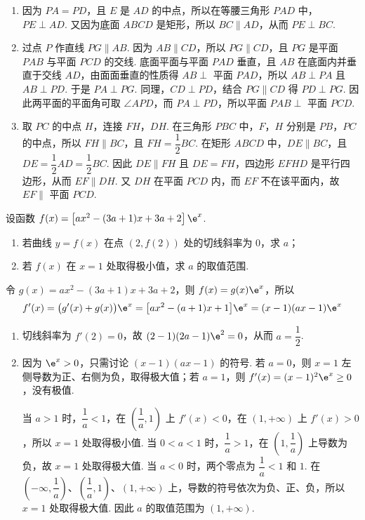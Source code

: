 \begin{solution}
\begin{enumerate}
\item 因为 \(PA=PD\)，且 \(E\) 是 \(AD\) 的中点，所以在等腰三角形 \(PAD\) 中，\(PE\perp AD\). 又因为底面 \(ABCD\) 是矩形，所以 \(BC\parallel AD\)，从而 \(PE\perp BC\).
\item 过点 \(P\) 作直线 \(PG\parallel AB\). 因为 \(AB\parallel CD\)，所以 \(PG\parallel CD\)，且 \(PG\) 是平面 \(PAB\) 与平面 \(PCD\) 的交线. 底面平面与平面 \(PAD\) 垂直，且 \(AB\) 在底面内并垂直于交线 \(AD\)，由面面垂直的性质得 \(AB\perp\) 平面 \(PAD\)，所以 \(AB\perp PA\) 且 \(AB\perp PD\). 于是 \(PA\perp PG\). 同理，\(CD\perp PD\)，结合 \(PG\parallel CD\) 得 \(PD\perp PG\). 因此两平面的平面角可取 \(\angle APD\)，而 \(PA\perp PD\)，所以平面 \(PAB\perp\) 平面 \(PCD\).
\item 取 \(PC\) 的中点 \(H\)，连接 \(FH\)，\(DH\). 在三角形 \(PBC\) 中，\(F\)，\(H\) 分别是 \(PB\)，\(PC\) 的中点，所以 \(FH\parallel BC\)，且 \(FH=\dfrac12BC\). 在矩形 \(ABCD\) 中，\(DE\parallel BC\)，且 \(DE=\dfrac12AD=\dfrac12BC\). 因此 \(DE\parallel FH\) 且 \(DE=FH\)，四边形 \(EFHD\) 是平行四边形，从而 \(EF\parallel DH\). 又 \(DH\) 在平面 \(PCD\) 内，而 \(EF\) 不在该平面内，故 \(EF\parallel\) 平面 \(PCD\).
\end{enumerate}
\end{solution}


\begin{problem}

设函数 \(f(x)=\left[ax^2-(3a+1)x+3a+2\right]\e^x\).

\begin{enumerate}
\item 若曲线 \(y=f(x)\) 在点 \(\left(2,f(2)\right)\) 处的切线斜率为 \(0\)，求 \(a\)；
\item 若 \(f(x)\) 在 \(x=1\) 处取得极小值，求 \(a\) 的取值范围.
\end{enumerate}
\end{problem}

\begin{solution}
令 \(g(x)=ax^2-(3a+1)x+3a+2\)，则 \(f(x)=g(x)\e^x\)，所以
\[
f'(x)=\bigl(g'(x)+g(x)\bigr)\e^x=\bigl[ax^2-(a+1)x+1\bigr]\e^x=(x-1)(ax-1)\e^x
\]

\begin{enumerate}
\item 切线斜率为 \(f'(2)=0\)，故 \((2-1)(2a-1)\e^2=0\)，从而 \(a=\dfrac12\).
\item 因为 \(\e^x>0\)，只需讨论 \((x-1)(ax-1)\) 的符号. 若 \(a=0\)，则 \(x=1\) 左侧导数为正、右侧为负，取得极大值；若 \(a=1\)，则 \(f'(x)=(x-1)^2\e^x\geq0\)，没有极值.

当 \(a>1\) 时，\(\dfrac1a<1\)，在 \(\left(\dfrac1a,1\right)\) 上 \(f'(x)<0\)，在 \((1,+\infty)\) 上 \(f'(x)>0\)，所以 \(x=1\) 处取得极小值. 当 \(0<a<1\) 时，\(\dfrac1a>1\)，在 \((1,\dfrac1a)\) 上导数为负，故 \(x=1\) 处取得极大值. 当 \(a<0\) 时，两个零点为 \(\dfrac1a<1\) 和 \(1\). 在 \(\left(-\infty,\dfrac1a\right)\)、\(\left(\dfrac1a,1\right)\)、\((1,+\infty)\) 上，导数的符号依次为负、正、负，所以 \(x=1\) 处取得极大值. 因此 \(a\) 的取值范围为 \((1,+\infty)\).
\end{enumerate}
\end{solution}


